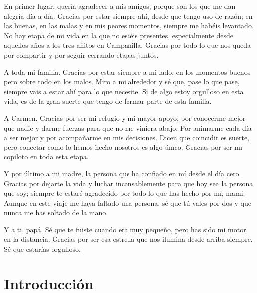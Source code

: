 \documentclass[twoside,spanish,a4paper,12pt]{tfg}
\begin{document}
\begin{agradecimientos}
En primer lugar, quería agradecer a mis amigos, porque son los que me dan alegría día a día. Gracias por estar siempre ahí, desde que tengo uso de razón; en las buenas, en las malas y en mis peores momentos, siempre me habéis levantado. No hay etapa de mi vida en la que no estéis presentes, especialmente desde aquellos años a los tres añitos en Campanilla. Gracias por todo lo que nos queda por compartir y por seguir cerrando etapas juntos.

A toda mi familia. Gracias por estar siempre a mi lado, en los momentos buenos pero sobre todo en los malos. Miro a mi alrededor y sé que, pase lo que pase, siempre vais a estar ahí para lo que necesite. Si de algo estoy orgulloso en esta vida, es de la gran suerte que tengo de formar parte de esta familia.

A Carmen. Gracias por ser mi refugio y mi mayor apoyo, por conocerme mejor que nadie y darme fuerzas para que no me viniera abajo. Por animarme cada día a ser mejor y por acompañarme en mis decisiones. Dicen que coincidir es suerte, pero conectar como lo hemos hecho nosotros es algo único. Gracias por ser mi copiloto en toda esta etapa.

Y por último a mi madre, la persona que ha confiado en mí desde el día cero. Gracias por dejarte la vida y luchar incansablemente para que hoy sea la persona que soy; siempre te estaré agradecido por todo lo que has hecho por mí, mami. Aunque en este viaje me haya faltado una persona, sé que tú vales por dos y que nunca me has soltado de la mano.

Y a ti, papá. Sé que te fuiste cuando era muy pequeño, pero has sido mi motor en la distancia. Gracias por ser esa estrella que nos ilumina desde arriba siempre. Sé que estarías orgulloso.
\end{agradecimientos}
\cleardoublepage

\tableofcontents

\pagestyle{tfg}
\justify



\chapter{Introducción}

\end{document}
